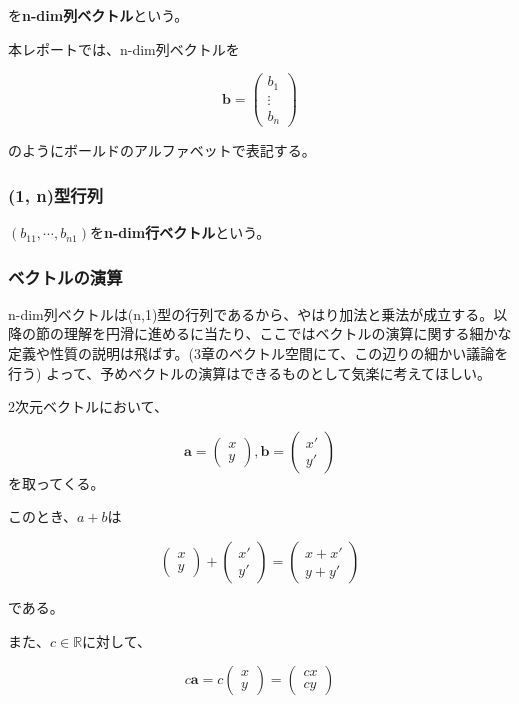 \documentclass[dvipdfmx,autodetect-engine]{jsarticle}
\begin{document}
を{\bf n-dim列ベクトル}という。

本レポートでは、n-dim列ベクトルを

$$
\bm{b} = \begin{pmatrix}
b_1 \\
\vdots \\
b_n
\end{pmatrix}
$$

のようにボールドのアルファベットで表記する。

\subsubsection{(1, n)型行列}

$(b_{11}, \cdots, b_{n1})$を{\bf n-dim行ベクトル}という。

\subsubsection{ベクトルの演算}

n-dim列ベクトルは(n,1)型の行列であるから、やはり加法と乗法が成立する。以降の節の理解を円滑に進めるに当たり、ここではベクトルの演算に関する細かな定義や性質の説明は飛ばす。(3章のベクトル空間にて、この辺りの細かい議論を行う) よって、予めベクトルの演算はできるものとして気楽に考えてほしい。

2次元ベクトルにおいて、

$$
\bm{a} = \begin{pmatrix}
x \\
y
\end{pmatrix},
\bm{b} = \begin{pmatrix}
x' \\
y'
\end{pmatrix}
$$
を取ってくる。

このとき、$a + b$は

$$
\begin{pmatrix}
x \\
y
\end{pmatrix} + 
\begin{pmatrix}
x' \\
y'
\end{pmatrix}
= \begin{pmatrix}
x + x' \\
y + y'
\end{pmatrix}
$$

である。

また、$c \in \mathbb{R}$に対して、

$$
c\bm{a} =
c\begin{pmatrix}
x \\
y
\end{pmatrix}
= \begin{pmatrix}
cx \\
cy
\end{pmatrix}
$$
\end{document}
